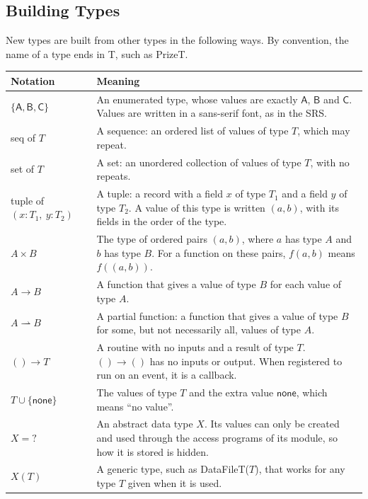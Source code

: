 \documentclass[10pt, titlepage]{article}
\newcommand{\V}[1]{\mathsf{#1}}          %
\begin{document}
\subsection{Building Types}

New types are built from other types in the following ways. By convention, the
name of a type ends in T, such as PrizeT.

\begin{center}
\renewcommand{\arraystretch}{1.3}
\begin{tabular}{p{4.6cm} p{10cm}}
\toprule
\textbf{Notation} & \textbf{Meaning}\\
\midrule
$\{\V{A}, \V{B}, \V{C}\}$ & An enumerated type, whose values are exactly
$\V{A}$, $\V{B}$ and $\V{C}$. Values are written in a sans-serif font, as in
the SRS.\\
seq of $T$ & A sequence: an ordered list of values of type $T$, which may
repeat.\\
set of $T$ & A set: an unordered collection of values of type $T$, with no
repeats.\\
tuple of $(x : T_1,\ y : T_2)$ & A tuple: a record with a field $x$ of type
$T_1$ and a field $y$ of type $T_2$. A value of this type is written
$(a, b)$, with its fields in the order of the type.\\
$A \times B$ & The type of ordered pairs $(a,b)$, where $a$ has type $A$
and $b$ has type $B$. For a function on these pairs, $f(a,b)$ means
$f((a,b))$.\\
$A \to B$ & A function that gives a value of type $B$ for each value of type
$A$.\\
$A \rightharpoonup B$ & A partial function: a function that gives a value of
type $B$ for some, but not necessarily all, values of type $A$.\\
$() \to T$ & A routine with no inputs and a result of type $T$.
$() \to ()$ has no inputs or output. When registered to run on an event,
it is a callback.\\
$T \cup \{\V{none}\}$ & The values of type $T$ and the extra value $\V{none}$,
which means ``no value''.\\
$X = ?$ & An abstract data type $X$. Its values can only be created and used
through the access programs of its module, so how it is stored is hidden.\\
$X(T)$ & A generic type, such as DataFileT($T$), that works for any type $T$
given when it is used.\\
\bottomrule
\end{tabular}
\end{center}
\end{document}
